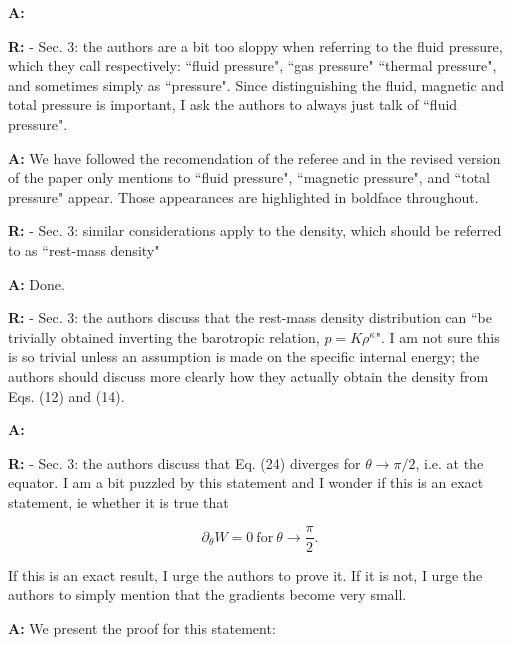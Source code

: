 \documentclass{article}
\begin{document}
\bigskip

{\bf A:} 

\bigskip

{\bf R:} - Sec. 3: the authors are a bit too sloppy when referring to the fluid
pressure, which they call respectively: ``fluid pressure", ``gas
pressure" ``thermal pressure", and sometimes simply as ``pressure". Since
distinguishing the fluid, magnetic and total pressure is important, I
ask the authors to always just talk of ``fluid pressure".

\bigskip

{\bf A:} We have followed the recomendation of the referee and in the revised version
of the paper only mentions to ``fluid pressure", ``magnetic pressure", and 
``total pressure" appear. Those appearances are highlighted in boldface
throughout.

\bigskip

{\bf R:} - Sec. 3: similar considerations apply to the density, which should
be referred to as ``rest-mass density"

\bigskip

{\bf A:} Done.

\bigskip

{\bf R:} - Sec. 3: the authors discuss that the rest-mass density distribution can
``be trivially obtained inverting the barotropic relation, $p = K
\rho^{\kappa}$". I am not sure this is so trivial unless an assumption is
made on the specific internal energy; the authors should discuss more
clearly how they actually obtain the density from Eqs. (12) and (14).

\bigskip

{\bf A:} 

\bigskip

{\bf R:} - Sec. 3: the authors discuss that Eq. (24) diverges for $\theta \rightarrow \pi/2$,
i.e. at the equator. I am a bit puzzled by this statement and I wonder if
this is an exact statement, ie whether it is true that

\begin{equation}
\partial_{\theta} W = 0 \ \mathrm{for} \ \theta \rightarrow \frac{\pi}{2}.
\end{equation}

If this is an exact result, I urge the authors to prove it. If it is
not, I urge the authors to simply mention that the gradients become
very small.

\bigskip

{\bf A:} We present the proof for this statement:
\end{document}
